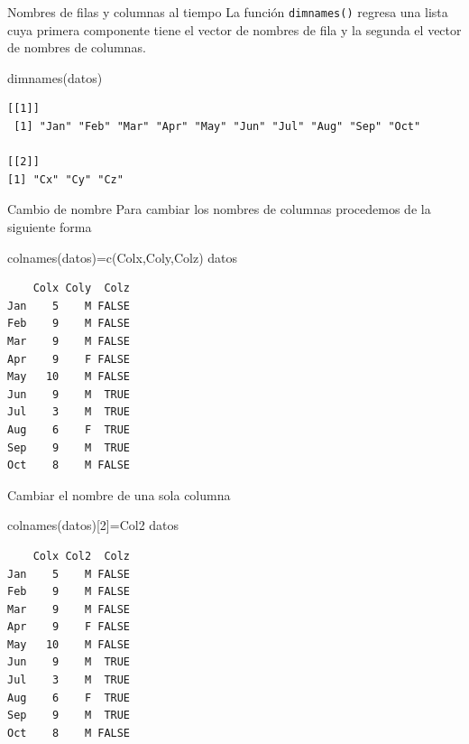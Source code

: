 \documentclass[
  ignorenonframetext,
  aspectratio=169,
  spanish,
]{beamer}
\newenvironment{Shaded}{\begin{snugshade}}{\end{snugshade}}
\newcommand{\DecValTok}[1]{\textcolor[rgb]{0.68,0.00,0.00}{#1}}
\newcommand{\FunctionTok}[1]{\textcolor[rgb]{0.28,0.35,0.67}{#1}}
\newcommand{\NormalTok}[1]{\textcolor[rgb]{0.00,0.23,0.31}{#1}}
\newcommand{\OtherTok}[1]{\textcolor[rgb]{0.00,0.23,0.31}{#1}}
\newcommand{\StringTok}[1]{\textcolor[rgb]{0.13,0.47,0.30}{#1}}
\begin{document}
\begin{frame}[fragile]{Nombres de filas y columnas al tiempo}
\label{nombres-de-filas-y-columnas-al-tiempo}
La función \texttt{dimnames()} regresa una lista cuya primera componente
tiene el vector de nombres de fila y la segunda el vector de nombres de
columnas.

\begin{Shaded}
\begin{Highlighting}[]
\FunctionTok{dimnames}\NormalTok{(datos)}
\end{Highlighting}
\end{Shaded}

\begin{verbatim}
[[1]]
 [1] "Jan" "Feb" "Mar" "Apr" "May" "Jun" "Jul" "Aug" "Sep" "Oct"

[[2]]
[1] "Cx" "Cy" "Cz"
\end{verbatim}
\end{frame}

\begin{frame}[fragile]{Cambio de nombre}
\label{cambio-de-nombre}
Para cambiar los nombres de columnas procedemos de la siguiente forma

\begin{Shaded}
\begin{Highlighting}[]
\FunctionTok{colnames}\NormalTok{(datos)}\OtherTok{=}\FunctionTok{c}\NormalTok{(}\StringTok{\textquotesingle{}Colx\textquotesingle{}}\NormalTok{,}\StringTok{\textquotesingle{}Coly\textquotesingle{}}\NormalTok{,}\StringTok{\textquotesingle{}Colz\textquotesingle{}}\NormalTok{) }
\NormalTok{datos}
\end{Highlighting}
\end{Shaded}

\begin{verbatim}
    Colx Coly  Colz
Jan    5    M FALSE
Feb    9    M FALSE
Mar    9    M FALSE
Apr    9    F FALSE
May   10    M FALSE
Jun    9    M  TRUE
Jul    3    M  TRUE
Aug    6    F  TRUE
Sep    9    M  TRUE
Oct    8    M FALSE
\end{verbatim}
\end{frame}

\begin{frame}[fragile]{Cambiar el nombre de una sola columna}
\label{cambiar-el-nombre-de-una-sola-columna}
\begin{Shaded}
\begin{Highlighting}[]
\FunctionTok{colnames}\NormalTok{(datos)[}\DecValTok{2}\NormalTok{]}\OtherTok{=}\StringTok{\textquotesingle{}Col2\textquotesingle{}} 
\NormalTok{datos}
\end{Highlighting}
\end{Shaded}

\begin{verbatim}
    Colx Col2  Colz
Jan    5    M FALSE
Feb    9    M FALSE
Mar    9    M FALSE
Apr    9    F FALSE
May   10    M FALSE
Jun    9    M  TRUE
Jul    3    M  TRUE
Aug    6    F  TRUE
Sep    9    M  TRUE
Oct    8    M FALSE
\end{verbatim}
\end{frame}
\end{document}
